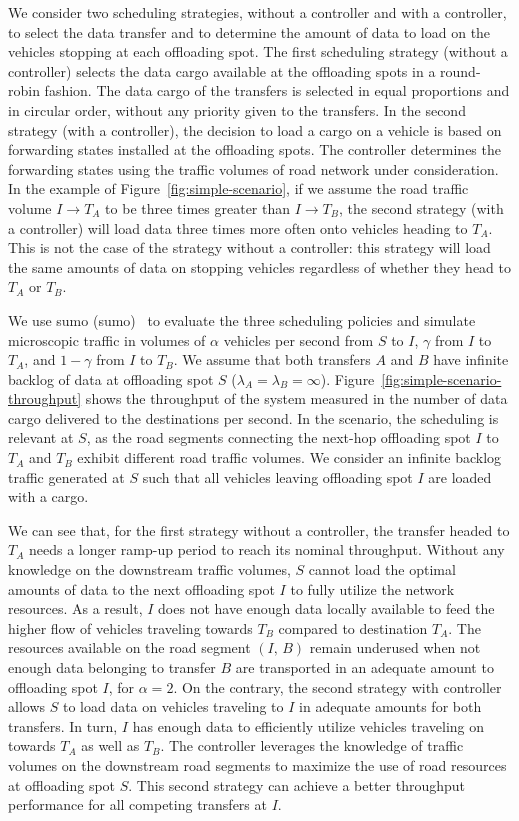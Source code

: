 We consider two scheduling strategies, without a controller and with a controller, to select the data transfer and to determine the amount of data to load on the vehicles stopping at each offloading spot. The first scheduling strategy (without a controller) selects the data cargo available at the offloading spots in a round-robin fashion. The data cargo of the transfers is selected in equal proportions and in circular order, without any priority given to the transfers. In the second strategy (with a controller), the decision to load a cargo on a vehicle is based on forwarding states installed at the offloading spots. The controller determines the forwarding states using the traffic volumes of road network under consideration. In the example of Figure~\ref{fig:simple-scenario}, if we assume the road traffic volume $I\rightarrow T_A$ to be three times greater than $I\rightarrow T_B$, the second strategy (with a controller) will load data three times more often onto vehicles heading to $T_A$. This is not the case of the strategy without a controller: this strategy will load the same amounts of data on stopping vehicles regardless of whether they head to $T_A$ or $T_B$.

We use \acrshort{sumo} (\acrlong{sumo})~\cite{behrisch2011sumo} to evaluate the three scheduling policies and simulate microscopic traffic in volumes of $\alpha$ vehicles per second from $S$ to $I$, $\gamma$ from $I$ to $T_A$, and $1 - \gamma$ from $I$ to $T_B$. We assume that both transfers $A$ and $B$ have infinite backlog of data at offloading spot $S$ (\ie $\lambda_A = \lambda_B = \infty$). Figure~\ref{fig:simple-scenario-throughput} shows the throughput of the system measured in the number of data cargo delivered to the destinations per second. In the scenario, the scheduling is relevant at $S$, as the road segments connecting the next-hop offloading spot $I$ to $T_A$ and $T_B$ exhibit different road traffic volumes. We consider an infinite backlog traffic generated at $S$ such that all vehicles leaving offloading spot $I$ are loaded with a cargo.

We can see that, for the first strategy without a controller, the transfer headed to $T_A$ needs a longer ramp-up period to reach its nominal throughput. Without any knowledge on the downstream traffic volumes, $S$ cannot load the optimal amounts of data to the next offloading spot $I$ to fully utilize the network resources. As a result, $I$ does not have enough data locally available to feed the higher flow of vehicles traveling towards $T_B$ compared to destination $T_A$. The resources available on the road segment $(I,\,B)$ remain underused when not enough data belonging to transfer $B$ are transported in an adequate amount to offloading spot $I$, \eg for $\alpha = 2$. On the contrary, the second strategy with controller allows $S$ to load data on vehicles traveling to $I$ in adequate amounts for both transfers. In turn, $I$ has enough data to efficiently utilize vehicles traveling on towards $T_A$ as well as $T_B$. The controller leverages the knowledge of traffic volumes on the downstream road segments to maximize the use of road resources at offloading spot $S$. This second strategy can achieve a better throughput performance for all competing transfers at $I$. 


